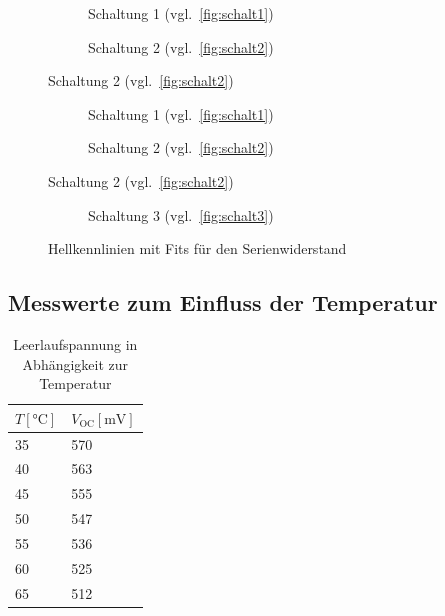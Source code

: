 \documentclass[slug=SZ, room=Hermann-Krone-Bau\,\ Labor\ 1.25,
supervisor=Martin\ Kroll, coursedate=14.\ 11.\ 2019]{../../Lab_Report_LaTeX/lab_report}
\newcommand{\voc}{V_{\text{OC}}}
\begin{document}
\begin{figure}[H]\centering
  \begin{subfigure}[b]{1\textwidth}\centering
    
    \caption{Schaltung 1 (vgl.~\ref{fig:schalt1})}
    \label{diag:hellschalt1fit}
  \end{subfigure}
  \begin{subfigure}[b]{1\textwidth}\centering
    
    \caption{Schaltung 2 (vgl.~\ref{fig:schalt2})}
    \label{diag:hellschalt2fit}
  \end{subfigure}
\end{figure}



\begin{figure}[H]\centering
  \begin{subfigure}[b]{1\textwidth}\centering
    
    \caption{Schaltung 1 (vgl.~\ref{fig:schalt1})}
    \label{diag:hellschalt1fit1}
  \end{subfigure}
  \begin{subfigure}[b]{1\textwidth}\centering
    
    \caption{Schaltung 2 (vgl.~\ref{fig:schalt2})}
    \label{diag:hellschalt2fit1}
  \end{subfigure}
\end{figure}

\begin{figure}[H]\centering
  \ContinuedFloat
  \begin{subfigure}[b]{1\textwidth}\centering
    
    \caption{Schaltung 3 (vgl.~\ref{fig:schalt3})}
    \label{diag:hellschalt3fit1}
  \end{subfigure}
  \caption{Hellkennlinien mit Fits f\"ur den Serienwiderstand}
  \label{fig:hellkennfit1}
\end{figure}



\subsection{Messwerte zum Einfluss der Temperatur}

\begin{table}[H]
        \centering
        \begin{tabular}{l|l}
                \toprule
                \(T [\si{\degreeCelsius}]\) & \(\voc [\si{\milli\volt}]\)\\
                \midrule
                35 & 570 \\
                40 & 563 \\
                45 & 555 \\
                50 & 547 \\
                55 & 536 \\
                60 & 525 \\
                65 & 512
        \end{tabular}
        \caption{Leerlaufspannung in Abhängigkeit zur Temperatur}
        \label{tab:messd}
\end{table}
\end{document}
